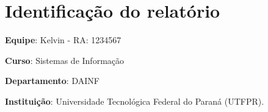 \section{Identificação do relatório}

\vspace{20pt} \noindent

\vspace{20pt} 

\textbf{Equipe}: Kelvin - RA: 1234567\\
        \hspace*{65pt}{Rafael Lammel Marinheiro - RA: 1986856}

\vspace{20pt} 

\textbf{Curso}: Sistemas de Informação

\vspace{20pt}

\textbf{Departamento}: DAINF

\vspace{20pt} 

\textbf{Instituição}: Universidade Tecnológica Federal do Paraná (UTFPR).